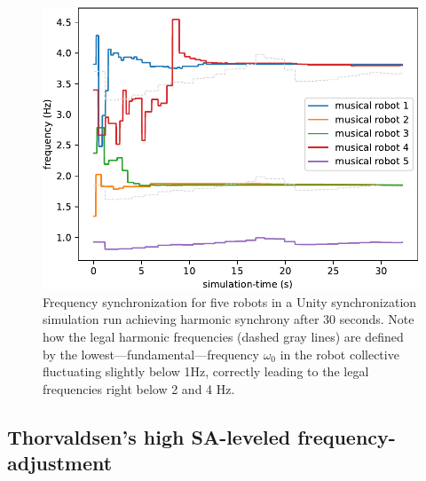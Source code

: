 	\begin{figure}
		\centering
		\includegraphics[width=\linewidth]{Assets/DocSegments/Chapters/Implementation/Figures/Plots/FrequencySynchronizationPlot.pdf}
		\caption{Frequency synchronization for five robots in a Unity synchronization simulation run achieving harmonic synchrony after 30 seconds. Note how the legal harmonic frequencies (dashed gray lines) are defined by the lowest—fundamental—frequency $\omega_0$ in the robot collective fluctuating slightly below 1Hz, correctly leading to the legal frequencies right below 2 and 4 Hz.}
		\label{fig:frequency_synch}
	\end{figure}
	
	
	\subsection{Thorvaldsen's high SA-leveled frequency-adjustment}
	
